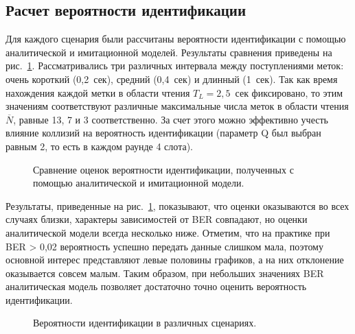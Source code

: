 \subsection{Расчет вероятности идентификации}

Для каждого сценария были рассчитаны вероятности идентификации с помощью аналитической и имитационной моделей. Результаты сравнения приведены на рис.~\ref{fig:ch3_results_prob_cmp}. Рассматривались три различных интервала между поступлениями меток: очень короткий (0,2~сек), средний (0,4~сек) и длинный (1~сек). Так как время нахождения каждой метки в области чтения $T_L = 2,5$~сек фиксировано, то этим значениям соответствуют различные максимальные числа меток в области чтения $\overline{N}$, равные 13, 7 и 3 соответственно. За счет этого можно эффективно учесть влияние коллизий на вероятность идентификации (параметр Q был выбран равным 2, то есть в каждом раунде 4 слота).

\begin{figure}[htb]
  \caption{Сравнение оценок вероятности идентификации, полученных с помощью аналитической и имитационной модели.}
  \label{fig:ch3_results_prob_cmp}
\end{figure}

Результаты, приведенные на рис.~\ref{fig:ch3_results_prob_cmp}, показывают, что оценки оказываются во всех случаях близки, характеры зависимостей от BER совпадают, но оценки аналитической модели всегда несколько ниже. Отметим, что на практике при BER > 0,02 вероятность успешно передать данные слишком мала, поэтому основной интерес представляют левые половины графиков, а на них отклонение оказывается совсем малым. Таким образом, при небольших значениях BER аналитическая модель позволяет достаточно точно оценить вероятность идентификации.

\begin{figure}[htb]
  \caption{Вероятности идентификации в различных сценариях.}
  \label{fig:ch3_results_probs}
\end{figure}

